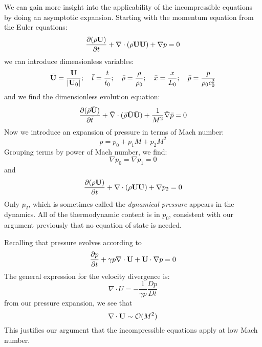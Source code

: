 We can gain more insight into the applicability of the incompressible 
equations by doing an asymptotic expansion.  Starting with the momentum
equation from the Euler equations:
\begin{equation}
\frac{\partial (\rho {\bf U})}{\partial t} + {\nabla}\cdot (\rho {\bf U}{\bf U}) + {\nabla}p = 0
\end{equation}
we can introduce dimensionless variables:
\begin{equation}
\bar{\bf U} = \frac{{\bf U}}{|{\bf U}_0|} ; \quad \bar{t} = \frac{t}{t_0} ; \quad \bar{\rho} = \frac{\rho}{\rho_0} ; \quad \bar{x} = \frac{x}{L_0} ; \quad \bar{p} = \frac{p}{\rho_0 c_0^2}
\end{equation}
and we find the dimensionless evolution equation:
\begin{equation}
\frac{\partial (\bar{\rho} \bar{\bf U})}{\partial \bar{t}} + \bar{\nabla} \cdot (\bar{\rho} \bar{\bf U}\bar{\bf U}) + \frac{1}{M^2} \bar{\nabla} \bar{p} = 0
\end{equation}
Now we introduce an expansion of pressure in terms of Mach number:
\begin{equation}
p = p_0 + p_1 M + p_2 M^2
\end{equation}
Grouping terms by power of Mach number, we find:
\begin{equation}
\nabla p_0 = \nabla p_1 = 0
\end{equation}
and
\begin{equation}
\frac{\partial (\rho {\bf U})}{\partial t} + {\nabla}\cdot (\rho {\bf U}{\bf U}) + {\nabla}p_2 = 0
\end{equation}
Only $p_2$, which is sometimes called the {\em dynamical pressure} appears in the dynamics.
All of the thermodynamic content is in $p_0$, consistent with our argument previously
that no equation of state is needed.

Recalling that pressure evolves according to
\begin{equation}
\frac{\partial p}{\partial t} + \gamma p {\nabla}\cdot {\bf U} + {\bf U}\cdot {\nabla}p = 0
\end{equation}
The general expression for the velocity divergence is:
\begin{equation}
{\nabla}\cdot {U} = -\frac{1}{\gamma p} \frac{Dp}{Dt}
\end{equation}
from our pressure expansion, we see that
\begin{equation}
\nabla \cdot {\bf U} \sim  \mathcal{O}(M^2)
\end{equation}
This justifies our argument that the incompressible equations apply at low Mach number.


